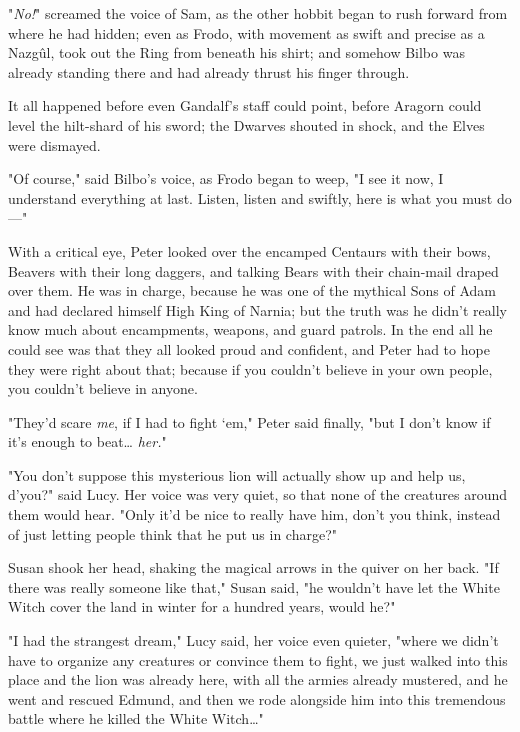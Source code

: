 "\emph{No!}" screamed the voice of Sam, as the other hobbit began to rush 
forward from where he had hidden; even as Frodo, with movement as swift and 
precise as a Nazgûl, took out the Ring from beneath his shirt; and somehow 
Bilbo was already standing there and had already thrust his finger through.

It all happened before even Gandalf's staff could point, before Aragorn could 
level the hilt-shard of his sword; the Dwarves shouted in shock, and the Elves 
were dismayed.

"Of course," said Bilbo's voice, as Frodo began to weep, "I see it now, I 
understand everything at last. Listen, listen and swiftly, here is what you 
must do---"
\sbreak

\noindent{}With a critical eye, Peter looked over the encamped Centaurs with their bows, 
Beavers with their long daggers, and talking Bears with their chain-mail draped 
over them. He was in charge, because he was one of the mythical Sons of Adam 
and had declared himself High King of Narnia; but the truth was he didn't 
really know much about encampments, weapons, and guard patrols. In the end all 
he could see was that they all looked proud and confident, and Peter had to 
hope they were right about that; because if you couldn't believe in your own 
people, you couldn't believe in anyone.

"They'd scare \emph{me}, if I had to fight `em," Peter said finally, "but I 
don't know if it's enough to beat{\ldots} \emph{her.}"

"You don't suppose this mysterious lion will actually show up and help us, 
d'you?" said Lucy. Her voice was very quiet, so that none of the creatures 
around them would hear. "Only it'd be nice to really have him, don't you think, 
instead of just letting people think that he put us in charge?"

Susan shook her head, shaking the magical arrows in the quiver on her back. "If 
there was really someone like that," Susan said, "he wouldn't have let the 
White Witch cover the land in winter for a hundred years, would he?"

"I had the strangest dream," Lucy said, her voice even quieter, "where we 
didn't have to organize any creatures or convince them to fight, we just walked 
into this place and the lion was already here, with all the armies already 
mustered, and he went and rescued Edmund, and then we rode alongside him into 
this tremendous battle where he killed the White Witch{\ldots}"

